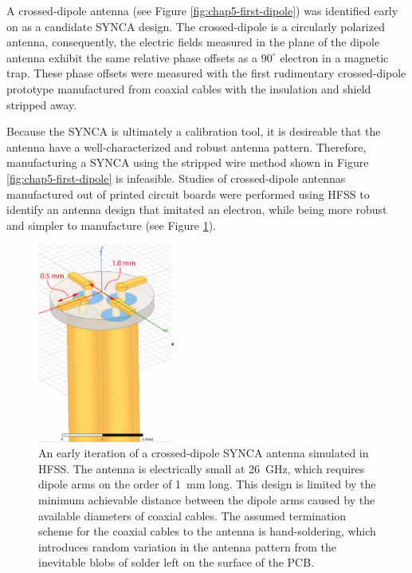 A crossed-dipole antenna \cite{balanis2011modern} (see Figure \ref{fig:chap5-first-dipole}) was identified early on as a candidate SYNCA design. The crossed-dipole is a circularly polarized antenna, consequently, the electric fields measured in the plane of the dipole antenna exhibit the same relative phase offsets as a $90^\circ$ electron in a magnetic trap. These phase offsets were measured with the first rudimentary crossed-dipole prototype manufactured from coaxial cables with the insulation and shield stripped away. 

Because the SYNCA is ultimately a calibration tool, it is desireable that the antenna have a well-characterized and robust antenna pattern. Therefore, manufacturing a SYNCA using the stripped wire method shown in Figure \ref{fig:chap5-first-dipole} is infeasible. Studies of crossed-dipole antennas manufactured out of printed circuit boards were performed using HFSS to identify an antenna design that imitated an electron, while being more robust and simpler to manufacture (see Figure \ref{fig:chap5-early-hfss-synca}). 

\begin{figure}
    \centering
    \includegraphics*[width=0.4\textwidth]{figs/Chapter-5/230801_early_hfss_prototype.png}
    \caption{\label{fig:chap5-early-hfss-synca} An early iteration of a crossed-dipole SYNCA antenna simulated in HFSS. The antenna is electrically small at 26~GHz, which requires dipole arms on the order of 1~mm long. This design is limited by the minimum achievable distance between the dipole arms caused by the available diameters of coaxial cables. The assumed termination scheme for the coaxial cables to the antenna is hand-soldering, which introduces random variation in the antenna pattern from the inevitable blobs of solder left on the surface of the PCB.}
\end{figure}

